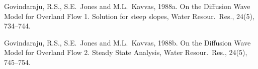 \begin{list}{}{
\setlength{\topsep}{0.in} \setlength{\partopsep}{0.in} \setlength{\itemsep}{0.in}
\setlength{\itemindent}{-0.30in}}
\item Govindaraju, R.S.,  S.E.\ Jones and M.L.\ Kavvas, 1988a. On the Diffusion Wave Model for
Overland Flow 1.  Solution for steep slopes, Water Resour.\ Res., 24(5), 734--744.

\item Govindaraju, R.S.,  S.E.\ Jones and M.L.\ Kavvas, 1988b. On the Diffusion Wave Model for
Overland Flow 2.  Steady State Analysis, Water Resour.\ Res., 24(5), 745--754.

%
%
%
%
%
%
%
%

\end{list}
